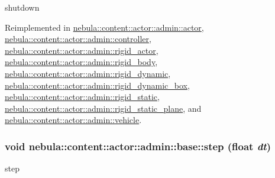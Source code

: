 shutdown 

Reimplemented in \hyperlink{classnebula_1_1content_1_1actor_1_1admin_1_1actor_a99f23953573c4f96672d9fb7b3cfe4fb}{nebula::content::actor::admin::actor}, \hyperlink{classnebula_1_1content_1_1actor_1_1admin_1_1controller_a745fba99f1dab2a7bdc5f5c54d14a8e2}{nebula::content::actor::admin::controller}, \hyperlink{classnebula_1_1content_1_1actor_1_1admin_1_1rigid__actor_afe9a6592087cac6054f6416d7c617eaa}{nebula::content::actor::admin::rigid\_\-actor}, \hyperlink{classnebula_1_1content_1_1actor_1_1admin_1_1rigid__body_ab0ed9e145b42efdd0049e2e1ef7d5da4}{nebula::content::actor::admin::rigid\_\-body}, \hyperlink{classnebula_1_1content_1_1actor_1_1admin_1_1rigid__dynamic_a6b7e8768902a320d8f7f483cf348a059}{nebula::content::actor::admin::rigid\_\-dynamic}, \hyperlink{classnebula_1_1content_1_1actor_1_1admin_1_1rigid__dynamic__box_af3ecd05192435e30fbe258f243d18adc}{nebula::content::actor::admin::rigid\_\-dynamic\_\-box}, \hyperlink{classnebula_1_1content_1_1actor_1_1admin_1_1rigid__static_a813d55717971528046af12804e01ff4e}{nebula::content::actor::admin::rigid\_\-static}, \hyperlink{classnebula_1_1content_1_1actor_1_1admin_1_1rigid__static__plane_a40139ed218560b51d64612559be0564d}{nebula::content::actor::admin::rigid\_\-static\_\-plane}, and \hyperlink{classnebula_1_1content_1_1actor_1_1admin_1_1vehicle_af9d76795459cf3acad5c5ec5a9b5b13b}{nebula::content::actor::admin::vehicle}.\hypertarget{classnebula_1_1content_1_1actor_1_1admin_1_1base_ac66cc3aa153fa2d6e45f1195d2027052}{
\subsubsection[{step}]{\setlength{\rightskip}{0pt plus 5cm}void nebula::content::actor::admin::base::step (float {\em dt})}}
\label{classnebula_1_1content_1_1actor_1_1admin_1_1base_ac66cc3aa153fa2d6e45f1195d2027052}


step 

